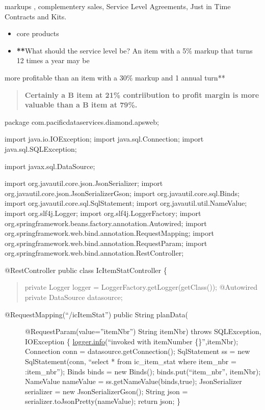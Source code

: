 \documentclass[letterpaper,10pt,english]{sphinxmanual}
\begin{document}
markups , complementery sales, Service Level Agreements, Just in Time Contracts and Kits.
\begin{itemize}
\item {} 
core products

\item {} 
{\color{red}\bfseries{}**}What should the service level be?  An item with a 5\% markup that turns 12 times a year may be

\end{itemize}

more profitable than an item with a 30\% markup and 1 annual turn**
\begin{quote}

\textbf{Certainly a B item at 21\% contriibution to profit margin is more valuable than a B item at 79\%.}
\end{quote}

package com.pacificdataservices.diamond.apsweb;

import java.io.IOException; import java.sql.Connection; import
java.sql.SQLException;

import javax.sql.DataSource;

import org.javautil.core.json.JsonSerializer; import
org.javautil.core.json.JsonSerializerGson; import
org.javautil.core.sql.Binds; import org.javautil.core.sql.SqlStatement;
import org.javautil.util.NameValue; import org.slf4j.Logger; import
org.slf4j.LoggerFactory; import
org.springframework.beans.factory.annotation.Autowired; import
org.springframework.web.bind.annotation.RequestMapping; import
org.springframework.web.bind.annotation.RequestParam; import
org.springframework.web.bind.annotation.RestController;

@RestController public class IcItemStatController \{
\begin{quote}

private Logger logger = LoggerFactory.getLogger(getClass());
@Autowired private DataSource datasource;
\end{quote}
\begin{description}
\item[{@RequestMapping(``/icItemStat'') public String planData(}] \leavevmode
@RequestParam(value=''itemNbr'') String itemNbr) throws SQLException,
IOException \{ \href{http://logger.info}{logger.info}(``invoked with
itemNumber \{\}'',itemNbr); Connection conn =
datasource.getConnection(); SqlStatement ss = new SqlStatement(conn,
``select * from ic\_item\_stat where item\_nbr = :item\_nbr''); Binds
binds = new Binds(); binds.put(``item\_nbr'', itemNbr); NameValue
nameValue = ss.getNameValue(binds,true); JsonSerializer serializer =
new JsonSerializerGson(); String json =
serializer.toJsonPretty(nameValue); return json; \}

\end{description}
\end{document}
